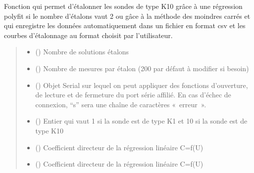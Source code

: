 \documentclass[letterpaper,10pt,french]{sphinxmanual}
\begin{document}
\begin{fulllineitems}
\label{\detokenize{Documentation:lib_conductimetre.Etalonnage_K1}}
\pysigstartsignatures
{}
\pysigstopsignatures
\sphinxAtStartPar
Fonction qui permet d’étalonner les sondes de type K10 grâce à une régression polyfit si le nombre d’étalons vaut 2  ou gâce à la méthode des moindres carrés et qui enregistre les données automatiquement dans un fichier en format csv et les courbes d’étalonnage au format choisit par l’utilisateur.
\begin{quote}\begin{description}
\begin{itemize}
\item {} 
\sphinxAtStartPar
{} () \textendash{} Nombre de solutions étalons

\item {} 
\sphinxAtStartPar
{} () \textendash{} Nombre de mesures par étalon (200 par défaut à modifier si besoin)

\item {} 
\sphinxAtStartPar
{} () \textendash{} Objet Serial sur lequel on peut appliquer des fonctions d’ouverture, de lecture et de fermeture du port série affilié. En cas d’échec de connexion, “s” sera une chaîne de caractères « erreur ».

\item {} 
\sphinxAtStartPar
{} () \textendash{} Entier qui vaut 1 si la sonde est de type K1 et 10 si la sonde est de type K10

\end{itemize}

\sphinxAtStartPar
\begin{itemize}
\item {} 
\sphinxAtStartPar
{} () \textendash{} Coefficient directeur de la régression linéaire C=f(U)

\item {} 
\sphinxAtStartPar
{} () \textendash{} Coefficient directeur de la régression linéaire C=f(U)

\end{itemize}


\end{description}\end{quote}

\end{fulllineitems}
\end{document}
